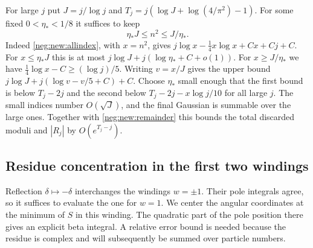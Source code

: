 \documentclass[11pt]{article}
\numberwithin{equation}{section}
\theoremstyle{definition}
\begin{document}
For large $j$ put $J=j/\log j$ and $T_j=j(\log J+\log(4/\pi^2)-1)$.
For some fixed $0<\eta_*<1/8$ it suffices to keep
\begin{equation}
                   \eta_* J\le n^2\le J/\eta_*.       \label{neg:new:middle}
\end{equation}
Indeed \eqref{neg:new:allindex}, with $x=n^2$, gives
$j\log x-\tfrac14x\log x+Cx+Cj+C$. For $x\le\eta_*J$ this is
at most $j\log J+j(\log\eta_*+C+o(1))$.
For $x\ge J/\eta_*$ we have $\tfrac14\log x-C\ge(\log j)/5$.
Writing $v=x/J$ gives the upper bound $j\log J+j(\log v-v/5+C)+C$.
Choose $\eta_*$ small enough that the first bound is below $T_j-2j$
and the second below $T_j-2j-x\log j/10$ for all large $j$.
The small indices number $O(\sqrt J)$, and the final Gaussian is
summable over the large ones. Together with \eqref{neg:new:remainder}
this bounds the total discarded moduli and $|R_j|$ by $O(e^{T_j-j})$.

\subsection{Residue concentration in the first two windings}

Reflection $\delta\mapsto-\delta$ interchanges the windings $w=\pm1$.
Their pole integrals agree, so it suffices to evaluate the one for $w=1$.
We center the angular coordinates at the minimum of $S$ in this winding.
The quadratic part of the pole position there gives an explicit beta
integral. A relative error bound is needed because the residue is
complex and will subsequently be summed over particle numbers.
\end{document}

